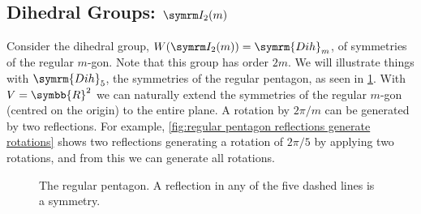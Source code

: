 \documentclass[fleqn, a4paper, openany]{memoir}
\newcommand{\reals}{\symbb{R}}
\newcommand{\Dih}{\symrm{Dih}}
\begin{document}
    \subsection{Dihedral Groups: \texorpdfstring{\(\I[2][m]\)}{I2m}}
    Consider the dihedral group, \(W(\I[2][m]) = \Dih_{m}\), of symmetries of the regular \(m\)-gon.
    Note that this group has order \(2m\).
    We will illustrate things with \(\Dih_5\), the symmetries of the regular pentagon, as seen in \cref{fig:regular pentagon reflections}.
    With \(V = \reals^2\) we can naturally extend the symmetries of the regular \(m\)-gon (centred on the origin) to the entire plane.
    A rotation by \(2\pi/m\) can be generated by two reflections.
    For example, \cref{fig:regular pentagon reflections generate rotations} shows two reflections generating a rotation of \(2\pi/5\) by applying two rotations, and from this we can generate all rotations.
    
    \begin{figure}
        \centering
        \caption[Reflections of the pentagon.]{The regular pentagon. A reflection in any of the five dashed lines is a symmetry.}
        \label{fig:regular pentagon reflections}
    \end{figure}
    
\end{document}

